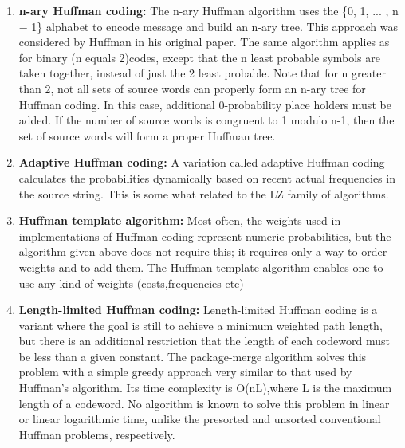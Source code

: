 \documentclass[12pt]{report}
\begin{document}
\begin{enumerate}

\item{\textbf{ n-ary Huffman coding: }} The n-ary Huffman algorithm uses the \{0, 1, ... , n − 1\} alphabet to encode message and build an n-ary tree. This approach was considered by Huffman in his original paper. The same algorithm applies as for binary (n equals 2)codes, except that the n least probable symbols are taken together, instead of just the 2 least probable. Note that for n greater than 2, not all sets of source words can properly form an n-ary tree for Huffman coding. In this case, additional 0-probability place holders must be added. If the number of source words is congruent to 1 modulo n-1, then the set of source words will form a proper Huffman tree.
\item{\textbf{Adaptive Huffman coding: }}A variation called adaptive Huffman coding calculates the probabilities dynamically based on recent actual frequencies in the source string. This is some what related to the LZ family of algorithms.
\item{\textbf{Huffman template algorithm: }}Most often, the weights used in implementations of Huffman coding represent numeric probabilities, but the algorithm given above does not require this; it requires only a way to order weights and to add them. The Huffman template algorithm enables one to use any kind of weights (costs,frequencies etc)
\item{\textbf{Length-limited Huffman coding: }}Length-limited Huffman coding is a variant where the goal is still to achieve a minimum weighted path length, but there is an additional restriction that the length of each codeword must be less than a given constant. The package-merge algorithm solves this problem with a simple greedy approach very similar to that used by Huffman's algorithm. Its time complexity is O(nL),where L is the maximum length of a codeword. No algorithm is known to solve this problem in linear or linear logarithmic time, unlike the presorted and unsorted conventional Huffman problems, respectively.
\end{enumerate}
\end{document}
